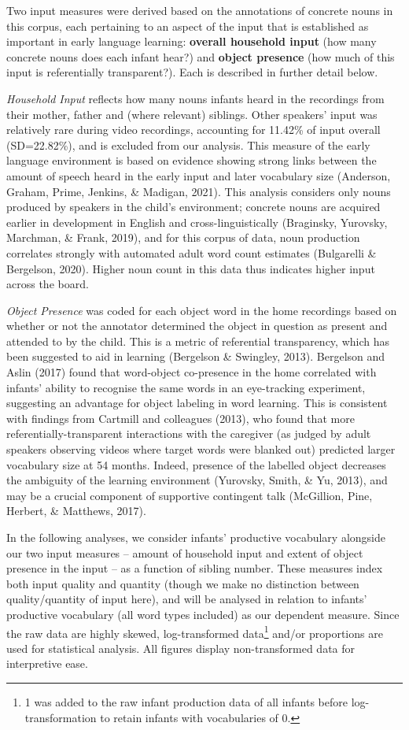 \documentclass[
  man,floatsintext]{apa6}
\begin{document}
Two input measures were derived based on the annotations of concrete nouns in this corpus, each pertaining to an aspect of the input that is established as important in early language learning: \textbf{overall household input} (how many concrete nouns does each infant hear?) and \textbf{object presence} (how much of this input is referentially transparent?). Each is described in further detail below.

\emph{Household Input} reflects how many nouns infants heard in the recordings from their mother, father and (where relevant) siblings. Other speakers' input was relatively rare during video recordings, accounting for 11.42\% of input overall (SD=22.82\%), and is excluded from our analysis. This measure of the early language environment is based on evidence showing strong links between the amount of speech heard in the early input and later vocabulary size (Anderson, Graham, Prime, Jenkins, \& Madigan, 2021). This analysis considers only nouns produced by speakers in the child's environment; concrete nouns are acquired earlier in development in English and cross-linguistically (Braginsky, Yurovsky, Marchman, \& Frank, 2019), and for this corpus of data, noun production correlates strongly with automated adult word count estimates (Bulgarelli \& Bergelson, 2020). Higher noun count in this data thus indicates higher input across the board.

\emph{Object Presence} was coded for each object word in the home recordings based on whether or not the annotator determined the object in question as present and attended to by the child. This is a metric of referential transparency, which has been suggested to aid in learning (Bergelson \& Swingley, 2013). Bergelson and Aslin (2017) found that word-object co-presence in the home correlated with infants' ability to recognise the same words in an eye-tracking experiment, suggesting an advantage for object labeling in word learning. This is consistent with findings from Cartmill and colleagues (2013), who found that more referentially-transparent interactions with the caregiver (as judged by adult speakers observing videos where target words were blanked out) predicted larger vocabulary size at 54 months. Indeed, presence of the labelled object decreases the ambiguity of the learning environment (Yurovsky, Smith, \& Yu, 2013), and may be a crucial component of supportive contingent talk (McGillion, Pine, Herbert, \& Matthews, 2017).

In the following analyses, we consider infants' productive vocabulary alongside our two input measures -- amount of household input and extent of object presence in the input -- as a function of sibling number. These measures index both input quality and quantity (though we make no distinction between quality/quantity of input here), and will be analysed in relation to infants' productive vocabulary (all word types included) as our dependent measure. Since the raw data are highly skewed, log-transformed data\footnote{1 was added to the raw infant production data of all infants before log-transformation to retain infants with vocabularies of 0.} and/or proportions are used for statistical analysis. All figures display non-transformed data for interpretive ease.
\end{document}
